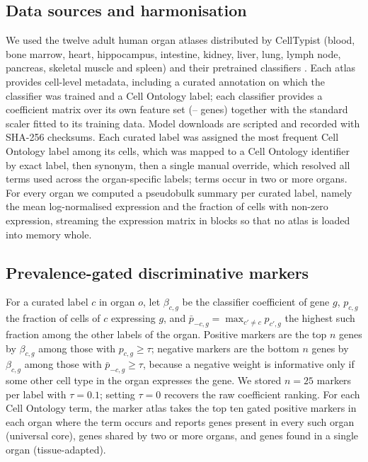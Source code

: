 \documentclass[11pt]{article}
\begin{document}
\subsection{Data sources and harmonisation}

We used the twelve adult human organ atlases distributed by CellTypist (blood, bone marrow, heart, hippocampus, intestine, kidney, liver, lung, lymph node, pancreas, skeletal muscle and spleen) and their pretrained classifiers \cite{xu2023,celltypistorgans}. Each atlas provides cell-level metadata, including a curated annotation on which the classifier was trained and a Cell Ontology label; each classifier provides a coefficient matrix over its own feature set (\minModelGenes{}--\maxModelGenes{} genes) together with the standard scaler fitted to its training data. Model downloads are scripted and recorded with SHA-256 checksums. Each curated label was assigned the most frequent Cell Ontology label among its cells, which was mapped to a Cell Ontology identifier \cite{diehl2016} by exact label, then synonym, then a single manual override, which resolved all \nCLTerms{} terms used across the \nLabels{} organ-specific labels; \nMultiOrganTerms{} terms occur in two or more organs. For every organ we computed a pseudobulk summary per curated label, namely the mean log-normalised expression and the fraction of cells with non-zero expression, streaming the expression matrix in blocks so that no atlas is loaded into memory whole.

\subsection{Prevalence-gated discriminative markers}

For a curated label $c$ in organ $o$, let $\beta_{c,g}$ be the classifier coefficient of gene $g$, $p_{c,g}$ the fraction of cells of $c$ expressing $g$, and $\bar p_{-c,g} = \max_{c' \neq c} p_{c',g}$ the highest such fraction among the other labels of the organ. Positive markers are the top $n$ genes by $\beta_{c,g}$ among those with $p_{c,g} \geq \tau$; negative markers are the bottom $n$ genes by $\beta_{c,g}$ among those with $\bar p_{-c,g} \geq \tau$, because a negative weight is informative only if some other cell type in the organ expresses the gene. We stored $n = 25$ markers per label with $\tau = 0.1$; setting $\tau = 0$ recovers the raw coefficient ranking. For each Cell Ontology term, the marker atlas takes the top ten gated positive markers in each organ where the term occurs and reports genes present in every such organ (universal core), genes shared by two or more organs, and genes found in a single organ (tissue-adapted).
\end{document}
